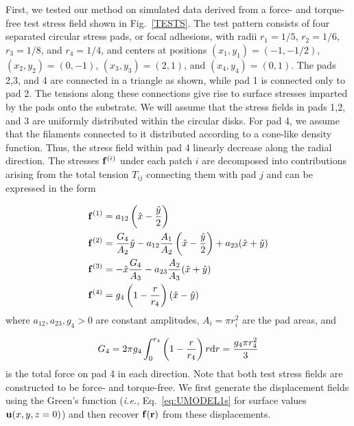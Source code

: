\documentclass[aps,prl,reprint,twocolumn,groupedaddress,showpacs]{revtex4}
\def\dd{\mbox{d}}
\def\f{{\bf f}}
\def\r{{\bf r}}
\def\u{{\bf u}}
\begin{document}
First, we tested our method on simulated data derived from a force-
and torque-free test stress field shown in Fig.~\ref{TESTS}. The test
pattern consists of four separated circular stress pads, or focal
adhesions, with radii $r_{1} = 1/5$, $r_{2} = 1/6$, $r_{3} = 1/8$, and
$r_{4} = 1/4$, and centers at positions $(x_{1},y_{1}) = (-1,-1/2)$,
$(x_{2},y_{2}) = (0,-1)$, $(x_{3},y_{3}) = (2,1)$, and $(x_{4},y_{4})
= (0,1)$.  The pads 2,3, and 4 are connected in a triangle as shown,
while pad 1 is connected only to pad 2.  The tensions along these
connections give rise to surface stresses imparted by the pads onto
the substrate.  We will assume that the stress fields in pads 1,2, and
3 are uniformly distributed within the circular disks. For pad 4, we
assume that the filaments connected to it distributed according to a
cone-like density function. Thus, the stress field within pad 4
linearly decrease along the radial direction. The stresses $\f^{(i)}$
under each patch $i$ are decomposed into contributions arising from
the total tension $T_{ij}$ connecting them with pad $j$ and can be
expressed in the form

\begin{align}
\f^{(1)} & = a_{12}\left(\hat{x} -{\hat{y}\over 2}\right) \label{SIGMA1}\\
\f^{(2)} & = {G_{4}\over A_{2}}\hat{y} - a_{12}{A_{1}\over A_{2}}\left(\hat{x} 
-{\hat{y}\over 2}\right) + a_{23}(\hat{x}+\hat{y}) \label{SIGMA2} \\
\f^{(3)} & = -\hat{x}{G_{4}\over A_{3}} - a_{23}{A_{2}\over A_{3}}(\hat{x}+\hat{y}) 
\label{SIGMA3}\\
\f^{(4)} & = g_{4}\left(1- {r \over r_{4}}\right)(\hat{x}-\hat{y})\label{SIGMA4}
\end{align}
%
where $a_{12}, a_{23}, g_{4} >0$ are constant amplitudes, 
$A_{i} = \pi r_{i}^{2}$ are the pad areas, and 

\begin{equation}
G_{4} = 2\pi g_{4}\int_{0}^{r_{4}}\left(1-{r\over r_{4}}\right)r\dd r = {g_{4}\pi r_{4}^{2}\over 3}
\end{equation}
%
is the total force on pad 4 in each direction. Note that both test
stress fields are constructed to be force- and torque-free. We first
generate the displacement fields using the Green's function 
(\textit{i.e.}, Eq.~\ref{eq:UMODEL1s} for surface values $\u(x,y,z=0)$)
and then recover $\f(\r)$ from these displacements.

%
\end{document}

